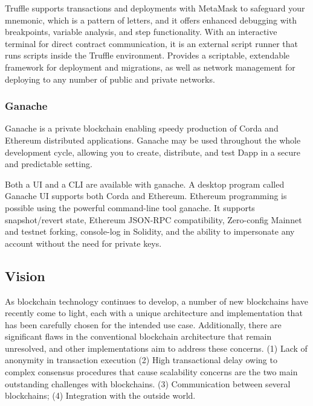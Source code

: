 \vspace{.5cm}

Truffle supports transactions and deployments with MetaMask to safeguard your mnemonic, which is a pattern of letters, and it offers enhanced debugging with breakpoints, variable analysis, and step functionality.
With an interactive terminal for direct contract communication, it is an external script runner that runs scripts inside the Truffle environment.
Provides a scriptable, extendable framework for deployment and migrations, as well as network management for deploying to any number of public and private networks.

\subsubsection{Ganache}

Ganache is a private blockchain enabling speedy production of Corda and Ethereum distributed applications. Ganache may be used throughout the whole development cycle, allowing you to create, distribute, and test \ac{Dapp} in a secure and predictable setting.

\vspace{.5cm}

Both a \ac{UI} and a \ac{CLI} are available with ganache. A desktop program called Ganache \ac{UI} supports both Corda and Ethereum. Ethereum programming is possible using the powerful command-line tool ganache. It supports snapshot/revert state, Ethereum JSON-RPC compatibility, Zero-config Mainnet and testnet forking, console-log in Solidity, and the ability to impersonate any account without the need for private keys.

\subsection{Vision}
As blockchain technology continues to develop, a number of new blockchains have recently come to light, each with a unique architecture and implementation that has been carefully chosen for the intended use case. Additionally, there are significant flaws in the conventional blockchain architecture that remain unresolved, and other implementations aim to address these concerns. (1) Lack of anonymity in transaction execution (2) High transactional delay owing to complex consensus procedures that cause scalability concerns are the two main outstanding challenges with blockchains. (3) Communication between several blockchains; (4) Integration with the outside world.

